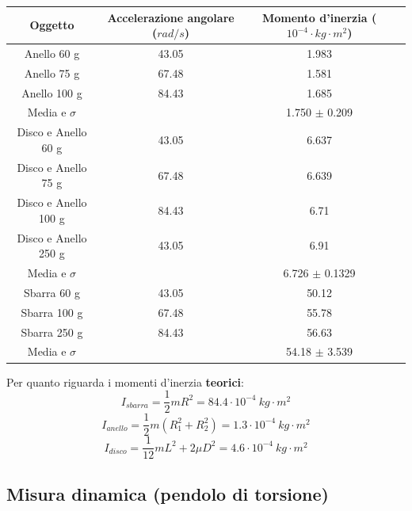 \begin{center}
\begin{tabular}{c|ccc}
Oggetto & Accelerazione angolare ($rad/s$) & Momento d'inerzia ($ 10^{-4} \cdot kg\cdot m^2$) \\
\midrule
Anello 60 g&43.05 & 1.983 \\
Anello 75 g &67.48 & 1.581 \\
Anello 100 g&84.43 & 1.685\\
\midrule
Media e $\sigma$&&1.750 $\pm$ 0.209 \\
\midrule
Disco e Anello 60 g&43.05 & 6.637 \\
Disco e Anello 75 g &67.48 & 6.639 \\
Disco e Anello 100 g&84.43 & 6.71\\
Disco e Anello 250 g&43.05 &  6.91 \\
\midrule
Media e $\sigma$&& 6.726 $\pm$ 0.1329\\
\midrule
Sbarra 60 g&43.05 & 50.12\\
Sbarra 100 g &67.48 & 55.78 \\
Sbarra 250 g&84.43 & 56.63\\
\midrule
Media e $\sigma$&& 54.18 $\pm$ 3.539\\
\midrule
\end{tabular}
\end{center}

Per quanto riguarda i momenti d'inerzia \textbf{teorici}:
$$ I_{sbarra} = \frac{1}{2} m R^2 = 84.4\cdot 10^{-4}\ kg\cdot m^2$$
$$ I_{anello} =\frac{1}{2} m (R^2_1 + R^2_2) = 1.3\cdot 10^{-4} \ kg\cdot m^2$$
$$ I_{disco} = \frac{1}{12} m L^2 + 2 \mu D^2 = 4.6\cdot 10^{-4} \ kg \cdot m^2$$



\subsection{Misura dinamica (pendolo di torsione)}

